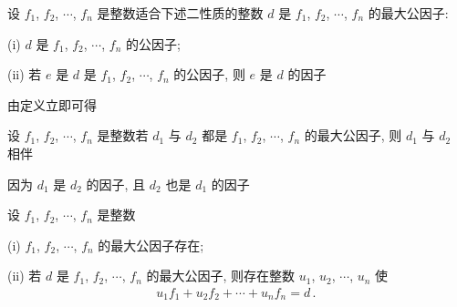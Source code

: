\begin{definition}
    设 $f_1$, $f_2$, $\cdots$, $f_n$ 是整数\period 适合下述二性质的整数 $d$ 是 $f_1$, $f_2$, $\cdots$, $f_n$ 的最大公因子:

    (i) $d$ 是 $f_1$, $f_2$, $\cdots$, $f_n$ 的公因子;

    (ii) 若 $e$ 是 $d$ 是 $f_1$, $f_2$, $\cdots$, $f_n$ 的公因子, 则 $e$ 是 $d$ 的因子\period
\end{definition}

由定义立即可得
\begin{proposition}
    设 $f_1$, $f_2$, $\cdots$, $f_n$ 是整数\period 若 $d_1$ 与 $d_2$ 都是 $f_1$, $f_2$, $\cdots$, $f_n$ 的最大公因子, 则 $d_1$ 与 $d_2$ 相伴\period
\end{proposition}

\begin{pf}
    因为 $d_1$ 是 $d_2$ 的因子, 且 $d_2$ 也是 $d_1$ 的因子\period
\end{pf}

\begin{proposition}
    设 $f_1$, $f_2$, $\cdots$, $f_n$ 是整数\period

    (i) $f_1$, $f_2$, $\cdots$, $f_n$ 的最大公因子存在;

    (ii) 若 $d$ 是 $f_1$, $f_2$, $\cdots$, $f_n$ 的最大公因子, 则存在整数 $u_1$, $u_2$, $\cdots$, $u_n$ 使
    \begin{align*}
        u_1 f_1 + u_2 f_2 + \cdots + u_n f_n = d \period
    \end{align*}
\end{proposition}

